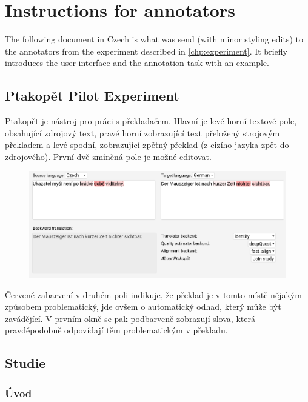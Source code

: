 \chapter{Instructions for annotators}

The following document in Czech is what was send (with minor styling edits) to the annotators from the experiment described in \cref{chp:experiment}. It briefly introduces the user interface and the annotation task with an example.

\section*{Ptakopět Pilot Experiment}

Ptakopět je nástroj pro práci s překladačem. Hlavní je levé horní textové pole, obsahující zdrojový text, pravé horní zobrazující text přeložený strojovým překladem a levé spodní, zobrazující zpětný překlad (z cizího jazyka zpět do zdrojového). První dvě zmíněná pole je možné editovat.

\begin{figure}[H]
  \centering
  \includegraphics[width=\textwidth]{img/instructions/layout.png}
\end{figure}

Červené zabarvení v druhém poli indikuje, že překlad je v tomto místě nějakým způsobem problematický, jde ovšem o automatický odhad, který může být zavádějící. V prvním okně se pak podbarveně zobrazují slova, která pravděpodobně odpovídají těm problematickým v překladu.

\section*{Studie}

\subsection*{Úvod}

